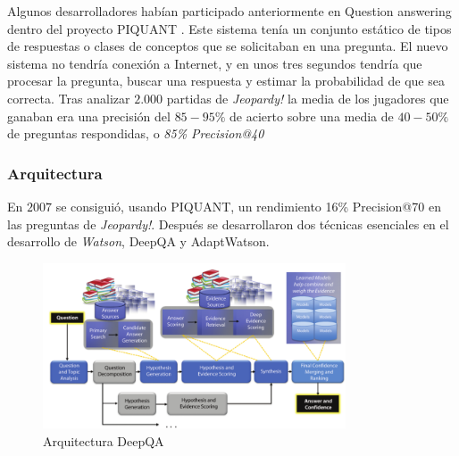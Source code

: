 \documentclass[paper=a4, fontsize=10pt]{scrartcl} %
\numberwithin{equation}{section} %
\numberwithin{figure}{section} %
\numberwithin{table}{section} %
\begin{document}

Algunos desarrolladores habían participado anteriormente en Question answering dentro del proyecto PIQUANT \cite{piquant}. %
Este sistema tenía un conjunto estático de tipos de respuestas o clases de conceptos que se solicitaban en una pregunta.
El nuevo sistema no tendría conexión a Internet, y en unos tres segundos tendría que procesar la pregunta, buscar una respuesta y estimar la probabilidad de que sea correcta.
Tras analizar $2.000$ partidas de \textit{Jeopardy!} la media de los jugadores que ganaban era una precisión del $85-95\%$ de acierto sobre una media de $40-50\%$ de preguntas respondidas, o 
\textit{85\% Precision@40}


\subsubsection{Arquitectura}
En $2007$ se consiguió, usando PIQUANT, un rendimiento 16\% Precision@70 en las preguntas de \textit{Jeopardy!}.
Después se desarrollaron dos técnicas esenciales en el desarrollo de \textit{Watson}, DeepQA %
y AdaptWatson. %

\begin{figure}[H]
	\centering
	\label{tiw-deepqa}
	\includegraphics[width=0.8\textwidth]{./Imagenes/deepQA.png}
	\caption{Arquitectura DeepQA}
\end{figure}
\end{document}
